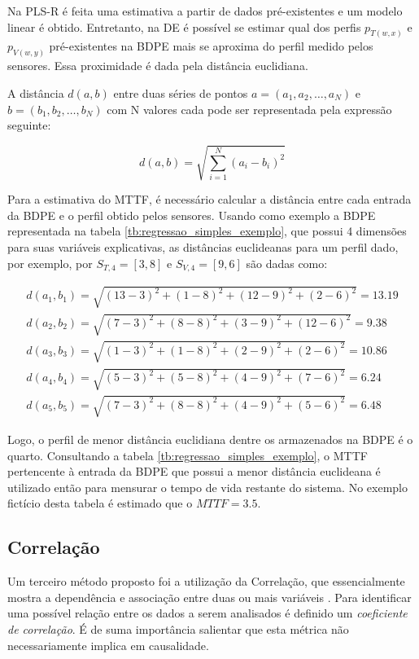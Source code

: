 Na PLS-R é feita uma estimativa a partir de dados pré-existentes e um modelo linear é obtido. Entretanto, na DE é possível se estimar qual dos perfis $p_{T(w,x)}$ e $p_{V(w,y)}$ pré-existentes na BDPE mais se aproxima do perfil medido pelos sensores. Essa proximidade é dada pela distância euclidiana.

A distância $d(a,b)$ entre duas séries de pontos $a=(a_1,a_2,\dots,a_N)$ e $b=(b_1,b_2,\dots,b_N)$ com N valores cada pode ser representada pela expressão seguinte:

\begin{equation}
d(a,b)=\sqrt{\sum_{i=1}^{N}(a_i-b_i)^2}
\label{eq:dist_euclideana}
\end{equation}

Para a estimativa do MTTF, é necessário calcular a distância entre cada entrada da BDPE e o perfil obtido pelos sensores. Usando como exemplo a BDPE representada na tabela \ref{tb:regressao_simples_exemplo}, que possui 4 dimensões para suas variáveis explicativas, as distâncias euclideanas para um perfil dado, por exemplo, por $S_{T,4} = [3,8]$ e $S_{V,4} = [9,6]$ são dadas como:

\begin{align}
d(a_1,b_1) = \sqrt{(13-3)^2+(1-8)^2+(12-9)^2+(2-6)^2} = 13.19 \\
d(a_2,b_2) = \sqrt{(7-3)^2+(8-8)^2+(3-9)^2+(12-6)^2} = 9.38 \\
d(a_3,b_3) = \sqrt{(1-3)^2+(1-8)^2+(2-9)^2+(2-6)^2} = 10.86 \\
d(a_4,b_4) = \sqrt{(5-3)^2+(5-8)^2+(4-9)^2+(7-6)^2} = 6.24 \\
d(a_5,b_5) = \sqrt{(7-3)^2+(8-8)^2+(4-9)^2+(5-6)^2} = 6.48
\end{align}

Logo, o perfil de menor distância euclidiana dentre os armazenados na BDPE é o quarto. Consultando a tabela \ref{tb:regressao_simples_exemplo}, o MTTF pertencente à entrada da BDPE que possui a menor distância euclideana é utilizado então para mensurar o tempo de vida restante do sistema. No exemplo fictício desta tabela é estimado que o $MTTF=3.5$.
\subsection{Correlação}
\label{subsection_estimativas_correlacao}

Um terceiro método proposto foi a utilização da Correlação, que essencialmente mostra a dependência e associação entre duas ou mais variáveis \cite{Rodgers1988}. Para identificar uma possível relação entre os dados a serem analisados é definido um \textit{coeficiente de correlação}. É de suma importância salientar que esta métrica não necessariamente implica em causalidade.

